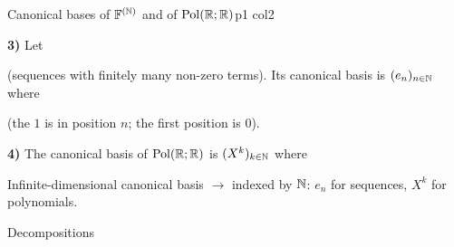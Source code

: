 \documentclass[course,noautoquant,noautokw]{neyvia-study}
\begin{document}
\begin{concept}[1.19]{Canonical bases of $\mathbb{F}^{(\mathbb{N})}$ and of $\mathrm{Pol}(\mathbb{R};\mathbb{R})$}{p1 col2}
\begin{definition}
\noindent \textbf{3)} Let
\par\noindent (sequences with finitely many non-zero terms). Its canonical basis is $(e_n)_{n\in\mathbb{N}}$ where
\par\noindent (the $1$ is in position $n$; the first position is $0$).
\par\noindent \textbf{4)} The canonical basis of $\mathrm{Pol}(\mathbb{R};\mathbb{R})$ is $(X^k)_{k\in\mathbb{N}}$ where
\end{definition}
\begin{reflex}
Infinite-dimensional canonical basis \ensuremath{\rightarrow} indexed by $\mathbb{N}$: $e_n$ for sequences, $X^k$ for polynomials.
\end{reflex}
\begin{worked}{Decompositions}
\end{worked}
\begin{traps}
\end{traps}
\begin{practice}
\end{practice}
\end{concept}
\end{document}
